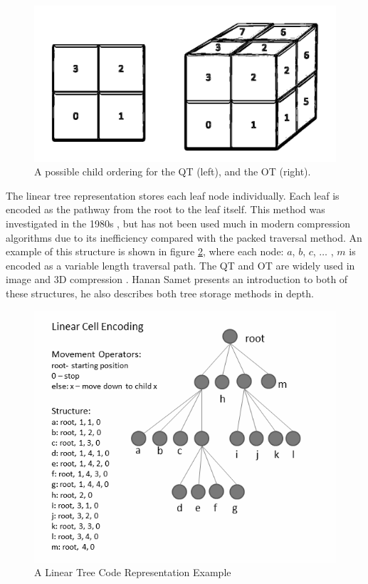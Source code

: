 \begin{figure}[!htb]
\centering
\includegraphics[width=12cm]{images/ch2/ChildOrderExample}
\caption{A possible child ordering for the QT (left), and the OT (right).}
\label{ChildOrderExample}
\end{figure}

The linear tree representation stores each leaf node individually. Each leaf is encoded as the pathway from the root to the leaf itself. This method was investigated in the 1980s \cite{Gargantini82Effective,Yufei88Octcodes}, but has not been used much in modern compression algorithms due to its inefficiency compared with the packed traversal method. An example of this structure is shown in figure \ref{LinearCellCodeRepresentation}, where each node: $a$, $b$, $c$, $\dots$ , $m$  is encoded as a variable length traversal path. The QT and OT are widely used in image \cite{Varma12Application} and 3D compression \cite{Schnabel06Octree}. Hanan Samet \cite{Samet88Fund1} presents an introduction to both of these structures, he also describes both tree storage methods in depth. 

\begin{figure}[!htb]
\centering
\includegraphics[width=12cm]{images/ch2/LinearCellCodeRepresentation}
\caption{A Linear Tree Code Representation Example}
\label{LinearCellCodeRepresentation}
\end{figure}



